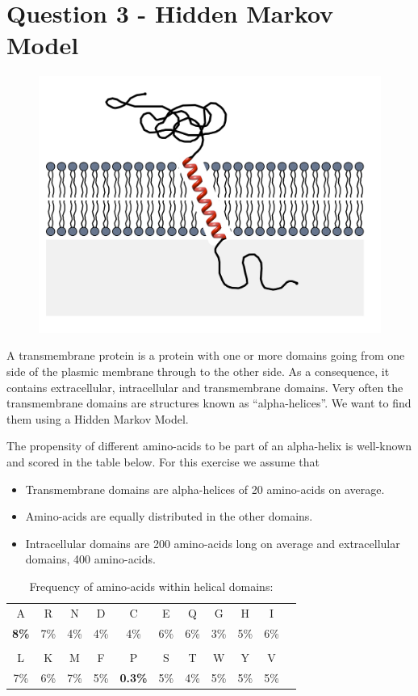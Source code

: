\documentclass[a4paper,11pt]{article}
\begin{document}
\section*{Question 3 - Hidden Markov Model}

\begin{figure}[h]
\center\includegraphics[scale=.2]{transmembrane.png}
\end{figure}

A transmembrane protein is a protein with one or more domains going from one side of the 
plasmic membrane through to the other side. As a consequence, it contains
extracellular, intracellular and transmembrane domains. 
Very often the transmembrane domains are structures 
known as ``alpha-helices''. 
We want to find them using a Hidden Markov Model.

The propensity of different amino-acids to be part of an alpha-helix
is well-known and scored in the table below.
For this exercise we assume that 
\begin{itemize}
\item Transmembrane domains are alpha-helices of 20 amino-acids on average. 
\item Amino-acids are equally distributed in the other domains.
\item Intracellular domains are 200 amino-acids long on average 
and extracellular domains, 400 amino-acids.
\end{itemize}

\begin{table}[h]
 \caption{Frequency of amino-acids within helical domains:}
  \begin{center}
    \begin{tabular}{ cccccccccc c }
      A & R & N & D & C & E & Q & G & H & I \\
      \bf{8\%} & 7\% & 4\% & 4\% & 4\% & 6\% & 6\% & 3\% & 5\% & 6\% \\
    \\
      L & K & M & F & P & S & T & W & Y & V \\
      7\% & 6\% & 7\% & 5\% & \bf{0.3\%} & 5\% & 4\% & 5\% & 5\% & 5\% \\
    \end{tabular}
  \end{center}
\end{table}
\end{document}
